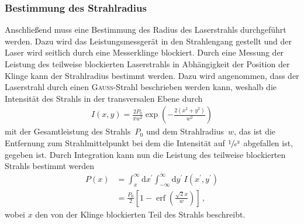 \documentclass[11pt, a4paper]{article}
\numberwithin{equation}{section}
\DeclareMathOperator{\erf}{erf}
\begin{document}
\subsubsection{Bestimmung des Strahlradius}
Anschließend muss eine Bestimmung des Radius des Laserstrahls durchgeführt werden.
Dazu wird das Leistungsmessgerät in den Strahlengang gestellt und der Laser wird seitlich durch eine Messerklinge blockiert.
Durch eine Messung der Leistung des teilweise blockierten Laserstrahls in Abhängigkeit der Position der Klinge kann der Strahlradius bestimmt werden.
Dazu wird angenommen, dass der Laserstrahl durch einen \textsc{Gauß}-Strahl beschrieben werden kann, weshalb die Intensität des Strahls in der transversalen Ebene durch
\begin{align*}
	I(x, y) = \frac{2 P_0}{\pi w^2} \exp\left(-\frac{2 (x^2 + y^2)}{w^2} \right)
\end{align*}
mit der Gesamtleistung des Strahls~$P_0$ und dem Strahlradius~$w$, das ist die Entfernung zum Strahlmittelpunkt bei dem die Intensität auf $\sfrac{1}{e^2}$ abgefallen ist, gegeben ist.
Durch Integration kann nun die Leistung des teilweise blockierten Strahls bestimmt werden
\begin{align}
	P(x) &= \int_{x}^{\infty} \mathrm{d}x^\prime \int_{-\infty}^{\infty} \mathrm{d}y^\prime \, I(x^\prime, y^\prime) \\
	     &= \frac{P_0}{2} \left[ 1 - \erf\left( \frac{\sqrt{2} x}{w}\right) \right] \, \text{,}
	\label{eq:erf_fit}
\end{align}
wobei $x$ den von der Klinge blockierten Teil des Strahls beschreibt.
\end{document}
